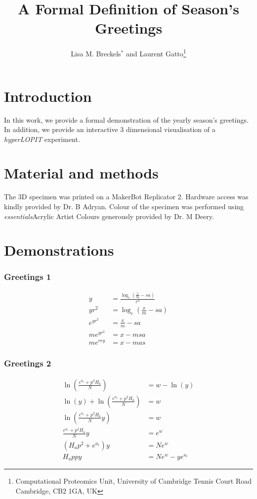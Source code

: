 \documentclass{article}
\title{A Formal Definition of Season's Greetings}
\author{Lisa M. Breckels$^*$
  and Laurent Gatto\footnote{Computational Proteomics Unit, University
    of Cambridge Tennis Court Road Cambridge, CB2 1GA, UK}}
\begin{document}
\maketitle

\section*{Introduction}

In this work, we provide a formal demonstration of the yearly season's
greetings. In addition, we provide an interactive 3 dimensional
visualisation of a \textit{hyperLOPIT} experiment\cite{LOPIT}.

\section*{Material and methods}

The 3D specimen was printed on a MakerBot Replicator 2. Hardware
access was kindly provided by Dr. B Adryan. Colour of the specimen was
performed using \textit{essentials}\texttrademark Acrylic Artist
Colours generously provided by Dr. M Deery.

\section*{Demonstrations}

\subsubsection*{Greetings 1}

\begin{varwidth}{\linewidth}
\begin{align*}
y &= \frac{\log_e \left(\frac{x}{m} - sa\right)}{r^2}\\
%
yr^2 &= \log_e \left(\frac{x}{m} - sa\right)\\
%
e^{yr^2} &= \frac{x}{m} - sa\\
%
me^{yr^2} &= x - msa\\
%
me^{rry} &= x - mas
\end{align*}
\end{varwidth}

\newpage

\subsubsection*{Greetings 2}

\begin{varwidth}{\linewidth}
\begin{align*}
\ln \left( \frac{e^{a_r} + p^2 H_a}{N} \right) &= w - \ln (y) \\
%
\ln (y) + \ln \left( \frac{e^{a_r} + p^2 H_a}{N} \right) &= w \\ 
%
\ln \left( \frac{e^{a_r} + p^2 H_a}{N} y \right) &= w\\
%
\frac{e^{a_r} + p^2 H_a}{N} y &= e^w\\
\left( H_a p^2  + e^{a_r} \right) y &= N e^w\\
H_a ppy &= N e^w - ye^{a_r}
\end{align*}
\end{varwidth}
\end{document}
